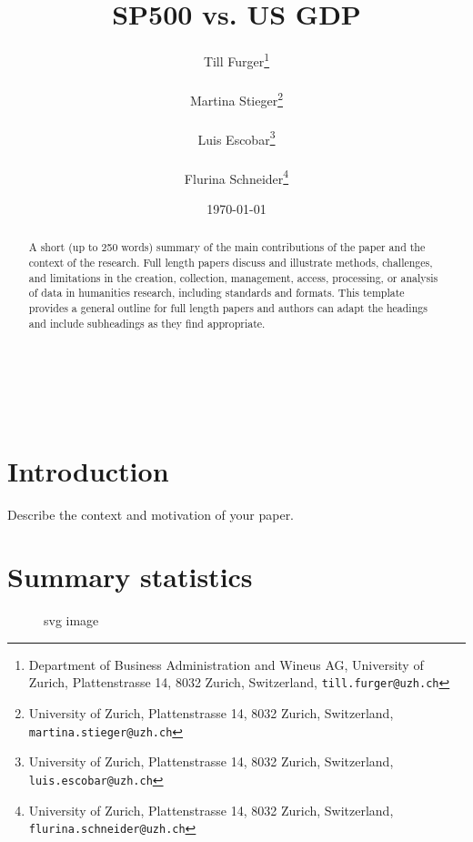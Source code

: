 \documentclass{article}
\title{SP500 vs. US GDP}
\author{
    Till Furger\thanks{Department of Business Administration and Wineus AG, University of Zurich, Plattenstrasse 14, 8032 Zurich, Switzerland, \tt{till.furger@uzh.ch}} \rule{0.5in}{0pt}
    
    Martina Stieger\thanks{University of Zurich, Plattenstrasse 14, 8032 Zurich, Switzerland, \tt{martina.stieger@uzh.ch}} \rule{0.5in}{0pt}
    
    Luis Escobar\thanks{University of Zurich, Plattenstrasse 14, 8032 Zurich, Switzerland, \tt{luis.escobar@uzh.ch}} \rule{0.5in}{0pt}
    
    Flurina Schneider\thanks{University of Zurich, Plattenstrasse 14, 8032 Zurich, Switzerland, \tt{flurina.schneider@uzh.ch}}\\
    
    \small \date{\today}
}
\begin{document}

\maketitle

\begin{abstract} 
\noindent A short (up to 250 words) summary of the main contributions of the paper and the context of the research. Full length papers discuss and illustrate methods, challenges, and limitations in the creation, collection, management, access, processing, or analysis of data in humanities research, including standards and formats. This template provides a general outline for full length papers and authors can adapt the headings and include subheadings as they find appropriate.
\end{abstract}

\hfill

\noindent{}\\
\noindent{}\\

\newpage


\tableofcontents

\section{Introduction}
Describe the context and motivation of your paper.

\section{Summary statistics}

\begin{figure}[htbp]
	\centering
	
	\caption{svg image}
\end{figure}
\end{document}
